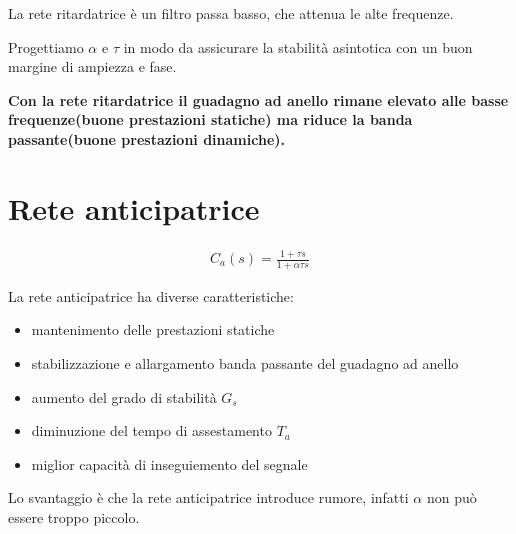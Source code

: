 La rete ritardatrice \`e un filtro passa basso, che attenua le alte frequenze.


Progettiamo $\alpha$ e $\tau$ in modo da assicurare la stabilit\`a asintotica
con un buon margine di ampiezza e fase.

\textbf{Con la rete ritardatrice il guadagno ad anello rimane elevato alle basse frequenze(buone prestazioni statiche)
ma riduce la banda passante(buone prestazioni dinamiche).}

\section{Rete anticipatrice}
\begin{align}
  C_a(s) = \frac{
    1 + \tau s
  }{
    1 + \alpha \tau s
  }
\end{align}



La rete anticipatrice ha diverse caratteristiche:
\begin{itemize}
  \item mantenimento delle prestazioni statiche
  \item stabilizzazione e allargamento banda passante del guadagno ad anello
  \item aumento del grado di stabilit\`a $G_s$
  \item diminuzione del tempo di assestamento $T_a$
  \item miglior capacit\`a di inseguiemento del segnale
\end{itemize}

Lo svantaggio \`e che la rete anticipatrice introduce rumore,
infatti $\alpha$ non pu\`o essere troppo piccolo.

